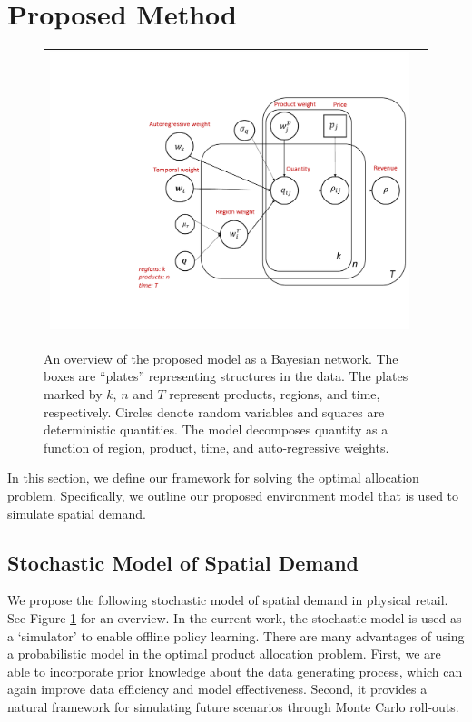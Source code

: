 \section{Proposed Method}\label{method}

\begin{figure}
\centering
\begin{tabular}{cc}
      \includegraphics[scale=.35]{figs/model-linear.pdf}
\end{tabular}
    
   
\caption{An overview of the proposed model as a Bayesian network. The boxes are ``plates'' representing structures in the data. The plates marked by $k$, $n$ and $T$ represent products, regions, and time, respectively.  Circles denote random variables and squares are deterministic quantities. The model decomposes quantity as a function of region, product, time, and auto-regressive weights.}
\label{model-fig}
\end{figure}

In this section, we define our framework for solving the optimal allocation problem. Specifically, we outline our proposed environment model that is used to simulate spatial demand. 


\subsection{Stochastic Model of Spatial Demand}\label{simple-model}

We propose the following stochastic model of spatial demand in physical retail. See Figure \ref{model-fig} for an overview. In the current work, the stochastic model is used as a `simulator' to enable offline policy learning. There are many advantages of using a probabilistic model in the optimal product allocation problem. First, we are able to incorporate prior knowledge about the data generating process, which can again improve data efficiency and model effectiveness. Second, it provides a natural framework for simulating future scenarios through Monte Carlo roll-outs.


